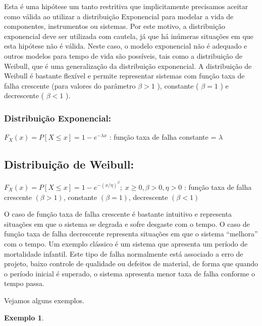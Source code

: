 \documentclass[
]{book}
\theoremstyle{definition}
\theoremstyle{definition}
\newtheorem{example}{Exemplo}[chapter]
\theoremstyle{definition}
\theoremstyle{remark}
\begin{document}
Esta é uma hipótese um tanto restritiva que implicitamente precisamos aceitar como válida ao utilizar a distribuição Exponencial para modelar a vida de componentes, instrumentos ou sistemas. Por este motivo, a distribuição exponencial deve ser utilizada com cautela, já que há inúmeras situações em que esta hipótese não é válida. Neste caso, o modelo exponencial não é adequado e outros modelos para tempo de vida são possíveis, tais como a distribuição de Weibull, que é uma generalização da distribuição exponencial. A distribuição de Weibull é bastante flexível e permite representar sistemas com função taxa de falha crescente (para valores do parâmetro \(\beta > 1\) ), constante ( \(\beta= 1\) ) e decrescente ( \(\beta < 1\) ).

\hypertarget{distribuiuxe7uxe3o-exponencial-1}{%
\subsubsection*{Distribuição Exponencial:}\label{distribuiuxe7uxe3o-exponencial-1}}

\(F_X(x) = P[X \leq x] = 1 - e^{-\lambda x}\) : função taxa de falha constante = \(\lambda\)

\hypertarget{distribuiuxe7uxe3o-de-weibull}{%
\subsection*{Distribuição de Weibull:}\label{distribuiuxe7uxe3o-de-weibull}}

\(F_X(x) = P[X \leq x] = 1 - e^{-(x/\eta)^\beta}; \; x \geq 0, \beta >0, \eta >0\) : função taxa de falha crescente \((\beta > 1)\), constante \((\beta=1)\), decrescente \((\beta < 1)\)

O caso de função taxa de falha crescente é bastante intuitivo e representa situações em que o sistema se degrada e sofre desgaste com o tempo. O caso de função taxa de falha decrescente representa situações em que o sistema ``melhora'' com o tempo. Um exemplo clássico é um sistema que apresenta um período de mortalidade infantil. Este tipo de falha normalmente está associado a erro de projeto, baixo controle de qualidade ou defeitos de material, de forma que quando o período inicial é superado, o sistema apresenta menor taxa de falha conforme o tempo passa.

Vejamos alguns exemplos.

\begin{example}
\protect\hypertarget{exm:unnamed-chunk-2}{}{\label{exm:unnamed-chunk-2} }
\end{example}
\end{document}
